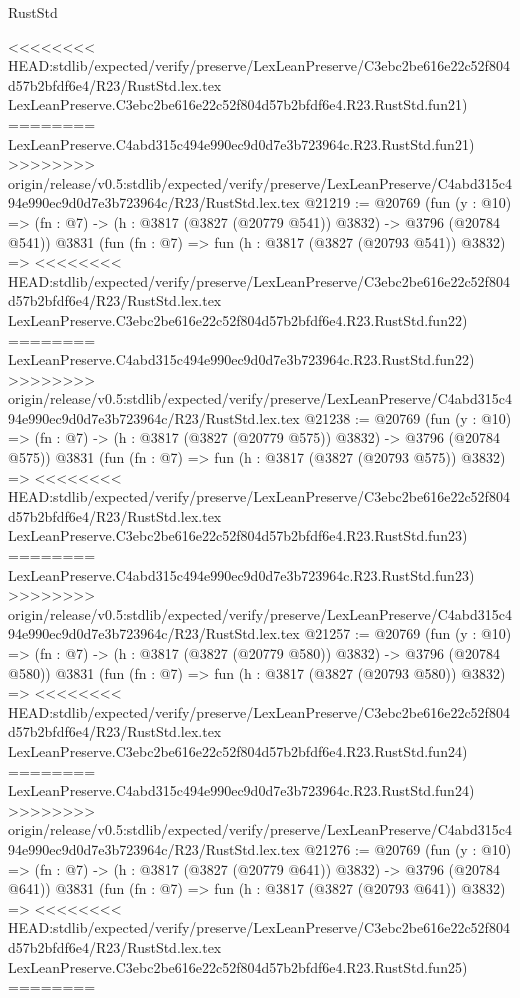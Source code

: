\begin{lexlean}{RustStd}
\begin{coremodule}
{\begin{coremodule}
{{{{{{{{{{{{{{{{{{{{{{{{{{{{{{{{{{{<<<<<<<< HEAD:stdlib/expected/verify/preserve/LexLeanPreserve/C3ebc2be616e22c52f804d57b2bfdf6e4/R23/RustStd.lex.tex
    LexLeanPreserve.C3ebc2be616e22c52f804d57b2bfdf6e4.R23.RustStd.fun21)
========
    LexLeanPreserve.C4abd315c494e990ec9d0d7e3b723964c.R23.RustStd.fun21)
>>>>>>>> origin/release/v0.5:stdlib/expected/verify/preserve/LexLeanPreserve/C4abd315c494e990ec9d0d7e3b723964c/R23/RustStd.lex.tex
@21219 := @20769
    (fun (y : @10) => (fn : @7) -> (h : @3817 (@3827 (@20779 @541)) @3832) -> @3796 (@20784 @541))
    @3831
    (fun (fn : @7) =>
    fun (h : @3817 (@3827 (@20793 @541)) @3832) =>
<<<<<<<< HEAD:stdlib/expected/verify/preserve/LexLeanPreserve/C3ebc2be616e22c52f804d57b2bfdf6e4/R23/RustStd.lex.tex
    LexLeanPreserve.C3ebc2be616e22c52f804d57b2bfdf6e4.R23.RustStd.fun22)
========
    LexLeanPreserve.C4abd315c494e990ec9d0d7e3b723964c.R23.RustStd.fun22)
>>>>>>>> origin/release/v0.5:stdlib/expected/verify/preserve/LexLeanPreserve/C4abd315c494e990ec9d0d7e3b723964c/R23/RustStd.lex.tex
@21238 := @20769
    (fun (y : @10) => (fn : @7) -> (h : @3817 (@3827 (@20779 @575)) @3832) -> @3796 (@20784 @575))
    @3831
    (fun (fn : @7) =>
    fun (h : @3817 (@3827 (@20793 @575)) @3832) =>
<<<<<<<< HEAD:stdlib/expected/verify/preserve/LexLeanPreserve/C3ebc2be616e22c52f804d57b2bfdf6e4/R23/RustStd.lex.tex
    LexLeanPreserve.C3ebc2be616e22c52f804d57b2bfdf6e4.R23.RustStd.fun23)
========
    LexLeanPreserve.C4abd315c494e990ec9d0d7e3b723964c.R23.RustStd.fun23)
>>>>>>>> origin/release/v0.5:stdlib/expected/verify/preserve/LexLeanPreserve/C4abd315c494e990ec9d0d7e3b723964c/R23/RustStd.lex.tex
@21257 := @20769
    (fun (y : @10) => (fn : @7) -> (h : @3817 (@3827 (@20779 @580)) @3832) -> @3796 (@20784 @580))
    @3831
    (fun (fn : @7) =>
    fun (h : @3817 (@3827 (@20793 @580)) @3832) =>
<<<<<<<< HEAD:stdlib/expected/verify/preserve/LexLeanPreserve/C3ebc2be616e22c52f804d57b2bfdf6e4/R23/RustStd.lex.tex
    LexLeanPreserve.C3ebc2be616e22c52f804d57b2bfdf6e4.R23.RustStd.fun24)
========
    LexLeanPreserve.C4abd315c494e990ec9d0d7e3b723964c.R23.RustStd.fun24)
>>>>>>>> origin/release/v0.5:stdlib/expected/verify/preserve/LexLeanPreserve/C4abd315c494e990ec9d0d7e3b723964c/R23/RustStd.lex.tex
@21276 := @20769
    (fun (y : @10) => (fn : @7) -> (h : @3817 (@3827 (@20779 @641)) @3832) -> @3796 (@20784 @641))
    @3831
    (fun (fn : @7) =>
    fun (h : @3817 (@3827 (@20793 @641)) @3832) =>
<<<<<<<< HEAD:stdlib/expected/verify/preserve/LexLeanPreserve/C3ebc2be616e22c52f804d57b2bfdf6e4/R23/RustStd.lex.tex
    LexLeanPreserve.C3ebc2be616e22c52f804d57b2bfdf6e4.R23.RustStd.fun25)
========
}}}}}}}}}}}}}}}}}}}}}}}}}}}}}}}}}}}
\end{coremodule}}
\end{coremodule}
\end{lexlean}

